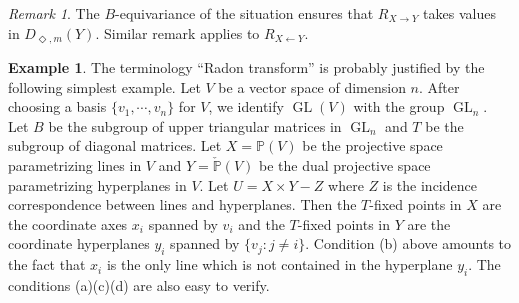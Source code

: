 \documentclass{amsart}
\theoremstyle{plain}
\theoremstyle{definition}
\newtheorem{ex}[subsubsection]{Example}
\theoremstyle{remark}
\newtheorem*{remark}{Remark}
\numberwithin{equation}{subsection}
\begin{document}
\begin{remark}
The $B$-equivariance of the situation ensures that $R_{X\to Y}$ takes values in ${D_{\Diamond,m}({Y})}$. Similar remark applies to $R_{X\leftarrow Y}$.
\end{remark}

\begin{ex}
The terminology ``Radon transform'' is probably justified by the following simplest example. Let $V$ be a vector space of dimension $n$. After choosing a basis $\{v_1,\cdots,v_n\}$ for $V$, we identify $\operatorname{GL}(V)$ with the group $\operatorname{GL}_n$. Let $B$ be the subgroup of upper triangular matrices in $\operatorname{GL}_n$ and $T$ be the subgroup of diagonal matrices. Let $X={\mathbb{P}}(V)$ be the projective space parametrizing lines in $V$ and $Y=\check{\mathbb{P}}(V)$ be the dual projective space parametrizing hyperplanes in $V$. Let $U=X\times Y-Z$ where $Z$ is the incidence correspondence between lines and hyperplanes. Then the $T$-fixed points in $X$ are the coordinate axes $x_i$ spanned by $v_i$ and the $T$-fixed points in $Y$ are the coordinate hyperplanes $y_i$ spanned by $\{v_j:j\neq i\}$. Condition (b) above amounts to the fact that $x_i$ is the only line which is not contained in the hyperplane $y_i$. The conditions (a)(c)(d) are also easy to verify.
\end{ex}
\end{document}
